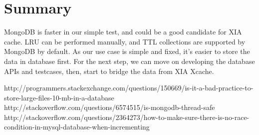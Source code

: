 \documentclass[letterpaper, 10 pt, conference]{ieeeconf}
\begin{document}
\section{Summary}

MongoDB is faster in our simple test, and could be a good candidate for XIA cache. LRU can be performed manually, and TTL collections are supported by MongoDB by default\cite{ttl}. As our use case is simple and fixed, it's easier to store the data in database first. For the next step, we can move on developing the database APIs and testcases, then, start to bridge the data from XIA Xcache.

\begin{thebibliography}{3}
     http://programmers.stackexchange.com/questions/150669/is-it-a-bad-practice-to-store-large-files-10-mb-in-a-database
     http://stackoverflow.com/questions/6574515/is-mongodb-thread-safe
     http://stackoverflow.com/questions/2364273/how-to-make-sure-there-is-no-race-condition-in-mysql-database-when-incrementing
\end{thebibliography}

\addtolength{\textheight}{-12cm}

\end{document}
